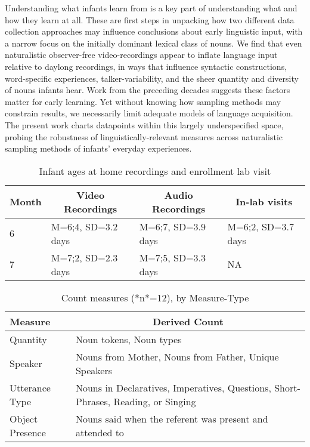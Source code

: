 \documentclass[man]{apa6}
\theoremstyle{definition}
\theoremstyle{definition}
\theoremstyle{definition}
\theoremstyle{remark}
\begin{document}
Understanding what infants learn from is a key part of understanding
what and how they learn at all. These are first steps in unpacking how
two different data collection approaches may influence conclusions about
early linguistic input, with a narrow focus on the initially dominant
lexical class of nouns. We find that even naturalistic observer-free
video-recordings appear to inflate language input relative to daylong
recordings, in ways that influence syntactic constructions,
word-specific experiences, talker-variability, and the sheer quantity
and diversity of nouns infants hear. Work from the preceding decades
suggests these factors matter for early learning. Yet without knowing
how sampling methods may constrain results, we necessarily limit
adequate models of language acquisition. The present work charts
datapoints within this largely underspecified space, probing the
robustness of linguistically-relevant measures across naturalistic
sampling methods of infants' everyday experiences.\newpage

\begin{table}[tbp]
\begin{center}
\begin{threeparttable}
\caption{\label{tab:recording-ages-table}Infant ages at home recordings and enrollment lab visit}
\begin{tabular}{llll}
\toprule
Month & \multicolumn{1}{c}{Video Recordings} & \multicolumn{1}{c}{Audio Recordings} & \multicolumn{1}{c}{In-lab visits}\\
\midrule
6 & M=6;4, SD=3.2 days & M=6;7, SD=3.9 days & M=6;2, SD=3.7 days\\
7 & M=7;2, SD=2.3 days & M=7;5, SD=3.3 days & NA\\
\bottomrule
\end{tabular}
\end{threeparttable}
\end{center}
\end{table}

\pagebreak

\begin{table}[tbp]
\begin{center}
\begin{threeparttable}
\caption{\label{tab:measures-tab}Count measures (*n*=12), by Measure-Type}
\small{
\begin{tabular}{ll}
\toprule
Measure & \multicolumn{1}{c}{Derived Count}\\
\midrule
Quantity & Noun tokens, Noun types\\
Speaker & Nouns from Mother, Nouns from Father, Unique Speakers\\
Utterance Type & Nouns in Declaratives, Imperatives, Questions, Short-Phrases, Reading, or Singing\\
Object Presence & Nouns said when the referent was present and attended to\\
\bottomrule
\end{tabular}
}
\end{threeparttable}
\end{center}
\end{table}
\end{document}
